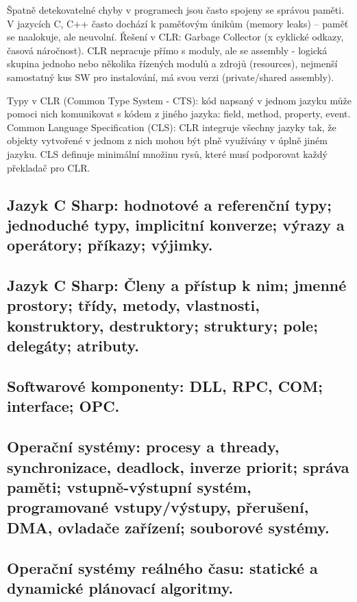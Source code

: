 Špatně detekovatelné chyby v programech jsou často spojeny se správou paměti. V jazycích C, C++ často dochází k paměťovým únikům (memory leaks) – paměť se naalokuje, ale neuvolní. Řešení v CLR: Garbage Collector (x cyklické odkazy, časová náročnost). CLR nepracuje přímo s moduly, ale se assembly - logická skupina jednoho nebo několika řízených modulů a zdrojů (resources), nejmenší samostatný kus SW pro instalování, má svou verzi (private/shared assembly).

Typy v CLR (Common Type System - CTS): kód napsaný v jednom jazyku může pomoci nich komunikovat s kódem z jiného jazyka: field, method, property, event. Common Language Specification (CLS): CLR integruje všechny jazyky tak, že objekty vytvořené v jednom z nich mohou být plně využívány v úplně jiném jazyku. CLS definuje minimální množinu rysů, které musí podporovat každý překladač pro CLR.

\subsection{Jazyk C Sharp: hodnotové a referenční typy; jednoduché typy, implicitní konverze; výrazy a operátory; příkazy; výjimky.}

\subsection{Jazyk C Sharp: Členy a přístup k nim; jmenné prostory; třídy, metody, vlastnosti, konstruktory, destruktory; struktury; pole; delegáty; atributy.}

\subsection{Softwarové komponenty: DLL, RPC, COM; interface; OPC.}

\subsection{Operační systémy: procesy a thready, synchronizace, deadlock, inverze priorit; správa paměti; vstupně-výstupní systém, programované vstupy/výstupy, přerušení, DMA, ovladače zařízení; souborové systémy.}

\subsection{Operační systémy reálného času: statické a dynamické plánovací algoritmy.}

